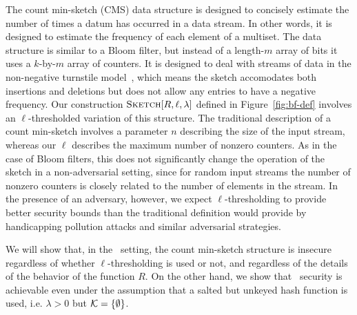 The count min-sketch (CMS) data structure is designed to concisely estimate the
number of times a datum has occurred in a data stream. In other words, it is
designed to estimate the frequency of each element of a multiset.  The data
structure is similar to a Bloom filter, but instead of a length-$m$ array of
bits it uses a $k$-by-$m$ array of counters. It is designed to deal with streams
of data in the non-negative turnstile model~\cite{cormode2005improved}, which
means the sketch accomodates both insertions and deletions but does not allow
any entries to have a negative frequency. Our construction
$\textnormal{\textsc{Sketch}}[R,\ell,\lambda]$ defined in Figure~\ref{fig:bf-def} involves an
$\ell$-thresholded variation of this structure. The traditional description of
a count min-sketch involves a parameter $n$ describing the size of the input
stream, whereas our $\ell$ describes the maximum number of nonzero counters. As
in the case of Bloom filters, this does not significantly change the operation
of the sketch in a non-adversarial setting, since for random input streams the
number of nonzero counters is closely related to the number of elements in the
stream.
%
In the presence of an adversary, however, we expect $\ell$-thresholding to
provide better security bounds than the traditional definition would provide by
handicapping pollution attacks and similar adversarial strategies.

We will show that, in the \errep\ setting, the count min-sketch structure is
insecure regardless of whether $\ell$-thresholding is used or not, and
regardless of the details of the behavior of the function $R$. On the other
hand, we show that \erreps\ security is achievable even under the assumption
that a salted but unkeyed hash function is used, i.e. $\lambda > 0$ but $\mathcal{K} =
\{\emptyset\}$.


